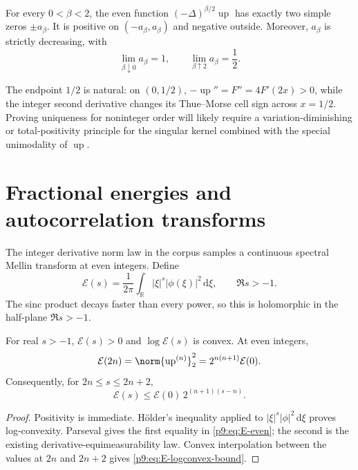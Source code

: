 \documentclass[11pt,oneside]{article}
\theoremstyle{definition}
\theoremstyle{remark}
\newcommand{\Up}{\operatorname{up}}
\newcommand{\R}{\mathbb R}
\newcommand{\dd}{\,\mathrm d}
\newcommand{\1}{\mathbf 1}
\begin{document}
\begin{conjecture}
\label{p9:conj:one-node}
For every $0<\beta<2$, the even function
$(-\Delta)^{\beta/2}\Up$ has exactly two simple zeros $\pm a_\beta$.
It is positive on $(-a_\beta,a_\beta)$ and negative outside.  Moreover,
$a_\beta$ is strictly decreasing, with
\begin{equation}
 \lim_{\beta\downarrow0}a_\beta=1,
 \qquad
 \lim_{\beta\uparrow2}a_\beta=\frac12.
 \label{p9:eq:one-node-limits}
\end{equation}
\end{conjecture}

The endpoint $1/2$ is natural: on $(0,1/2)$,
$-\Up''=F''=4F'(2x)>0$, while the integer second derivative changes its
Thue--Morse cell sign across $x=1/2$.  Proving uniqueness for noninteger order
will likely require a variation-diminishing or total-positivity principle for
the singular kernel combined with the special unimodality of $\Up$.

\section{Fractional energies and autocorrelation transforms}
\label{p9:sec:fractional-energy}

The integer derivative norm law in the corpus samples a continuous spectral
Mellin transform at even integers.  Define
\begin{equation}
 \mathcal E(s)
 =\frac1{2\pi}\int_{\R}|\xi|^s|\phi(\xi)|^2\dd\xi,
 \qquad \Re s>-1.
 \label{p9:eq:E-s}
\end{equation}
The sinc product decays faster than every power, so this is holomorphic in the
half-plane $\Re s>-1$.

\begin{proposition}
For real $s>-1$, $\mathcal E(s)>0$ and $\log\mathcal E(s)$ is convex.  At even
integers,
\begin{equation}
 \mathcal E(2n)=\norm{\Up^{(n)}}_2^2
 =2^{n(n+1)}\mathcal E(0).
 \label{p9:eq:E-even}
\end{equation}
Consequently, for $2n\le s\le2n+2$,
\begin{equation}
 \mathcal E(s)
 \le \mathcal E(0)\,2^{(n+1)(s-n)}.
 \label{p9:eq:E-logconvex-bound}
\end{equation}
\end{proposition}

\begin{proof}
Positivity is immediate.  Hölder's inequality applied to
$|\xi|^s|\phi|^2\dd\xi$ proves log-convexity.  Parseval gives the first equality
in \cref{p9:eq:E-even}; the second is the existing derivative-equimeasurability
law.  Convex interpolation between the values at $2n$ and $2n+2$ gives
\cref{p9:eq:E-logconvex-bound}.
\end{proof}
\end{document}
